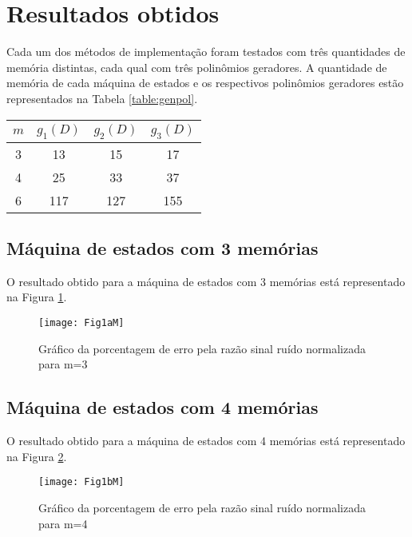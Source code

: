\section{Resultados obtidos}

Cada um dos métodos de implementação foram testados com três quantidades de memória distintas, cada qual com três polinômios geradores. A quantidade de memória de cada máquina de estados e os respectivos polinômios geradores estão representados na Tabela \ref{table:genpol}.

\begin{table}[H]
	\centering
	\captionsetup{font=scriptsize}
	 \label{tab:title2}
	\begin{tabular}{c|ccc}
		\textbf{$m$} & \textbf{$g_{1}(D)$} & \textbf{$g_{2}(D)$} & \textbf{$g_{3}(D)$} \\ \hline
		3 & 13 & 15 & 17 \\
		4 & 25 & 33 & 37 \\
		6 & 117 & 127 & 155
	\end{tabular}
\end{table}

\subsection{Máquina de estados com 3 memórias}

O resultado obtido para a máquina de estados com 3 memórias está representado na Figura \ref{fig:Fig1aM}.

\begin{figure}[H]
\centering
\texttt{[image: Fig1aM]}
\captionsetup{font=scriptsize}
\caption{Gráfico da porcentagem de erro pela razão sinal ruído normalizada para m=3\label{fig:Fig1aM}}
\end{figure}

\subsection{Máquina de estados com 4 memórias}

O resultado obtido para a máquina de estados com 4 memórias está representado na Figura \ref{fig:Fig1bM}.

\begin{figure}[H]
	\centering
	\texttt{[image: Fig1bM]}
	\captionsetup{font=scriptsize}
	\caption{Gráfico da porcentagem de erro pela razão sinal ruído normalizada para m=4\label{fig:Fig1bM}}
\end{figure}


